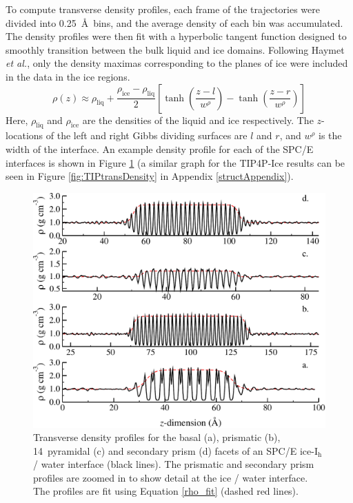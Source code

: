 To compute transverse density profiles, each frame of the trajectories
were divided into 0.25~\AA~bins, and the average density of each bin
was accumulated. The density profiles were then fit with a hyperbolic
tangent function designed to smoothly transition between the bulk
liquid and ice domains. Following Haymet \textit{et al.}, only the
density maximas corresponding to the planes of ice were included in
the data in the ice regions.
\begin{equation}\label{rho_fit}
\rho (z) \approx
\rho_\mathrm{liq}+\frac{\rho_\mathrm{ice}-\rho_\mathrm{liq}}{2}\left[\tanh\left(\frac{z-l}{w^\rho}\right)-\tanh\left(\frac{z-r}{w^\rho}\right)\right]
\end{equation}
Here, $\rho_\mathrm{liq}$ and $\rho_\mathrm{ice}$ are the densities of
the liquid and ice respectively. The $z$-locations of the left and
right Gibbs dividing surfaces are $l$ and $r$, and $w^\rho$ is the
width of the interface. An example density profile for each of the
SPC/E interfaces is shown in Figure \ref{fig:transDensity} (a similar
graph for the TIP4P-Ice results can be seen in Figure
\ref{fig:TIPtransDensity} in Appendix \ref{structAppendix}).

\begin{figure}
\includegraphics[width=\linewidth]{Figures/transDensity}
\caption{\label{fig:transDensity}Transverse density profiles for the
  basal (a), prismatic (b), 14\degree~pyramidal (c) and secondary prism (d)
  facets of an SPC/E ice-I$_\mathrm{h}$ / water interface (black
  lines). The prismatic and secondary prism profiles are zoomed in to
  show detail at the ice / water interface. The profiles are fit using
  Equation \eqref{rho_fit} (dashed red lines).}
\end{figure}

